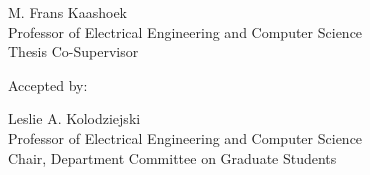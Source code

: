 \documentclass[fontsize=12pt,paper=letter]{scrartcl}
\begin{document}
\begin{titlepage}
{  \raggedleft
  M. Frans Kaashoek\\
  Professor of Electrical Engineering and Computer Science\\
  Thesis Co-Supervisor\\
  }

  \vspace{\baselineskip}
  {
  \raggedright
  Accepted by: \dotfill

  \raggedleft
  Leslie A. Kolodziejski\\
  Professor of Electrical Engineering and Computer Science\\
  Chair, Department Committee on Graduate Students\\
  }
\end{titlepage}
\end{document}
